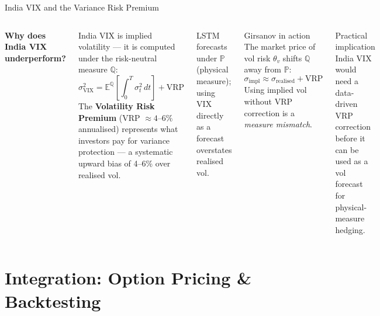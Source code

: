 \documentclass[aspectratio=169,10pt]{beamer}
\begin{document}
\begin{frame}{India VIX and the Variance Risk Premium}
\begin{columns}[T]
\textbf{Why does India VIX underperform?}

\medskip
India VIX is implied volatility — it is computed under the risk-neutral measure $\mathbb{Q}$:
\[
  \sigma_{\text{VIX}}^2 = \mathbb{E}^{\mathbb{Q}}\!\left[\int_0^T \sigma_t^2\,dt\right] + \text{VRP}
\]
The \textbf{Volatility Risk Premium} (VRP $\approx 4$--$6\%$ annualised) represents what investors pay for variance protection — a systematic upward bias of 4--6\% over realised vol.

\medskip
LSTM forecasts under $\mathbb{P}$ (physical measure); using VIX directly as a forecast overstates realised vol.

\begin{alertblock}{Girsanov in action}
The market price of vol risk $\theta_v$ shifts $\mathbb{Q}$ away from $\mathbb{P}$:
\[
  \sigma_{\text{impl}} \approx \sigma_{\text{realised}} + \text{VRP}
\]
Using implied vol without VRP correction is a \emph{measure mismatch}.
\end{alertblock}

\medskip
\begin{block}{Practical implication}
India VIX would need a data-driven VRP correction before it can be used as a vol forecast for physical-measure hedging.
\end{block}
\end{columns}
\end{frame}

\section{Integration: Option Pricing \& Backtesting}
\end{document}
